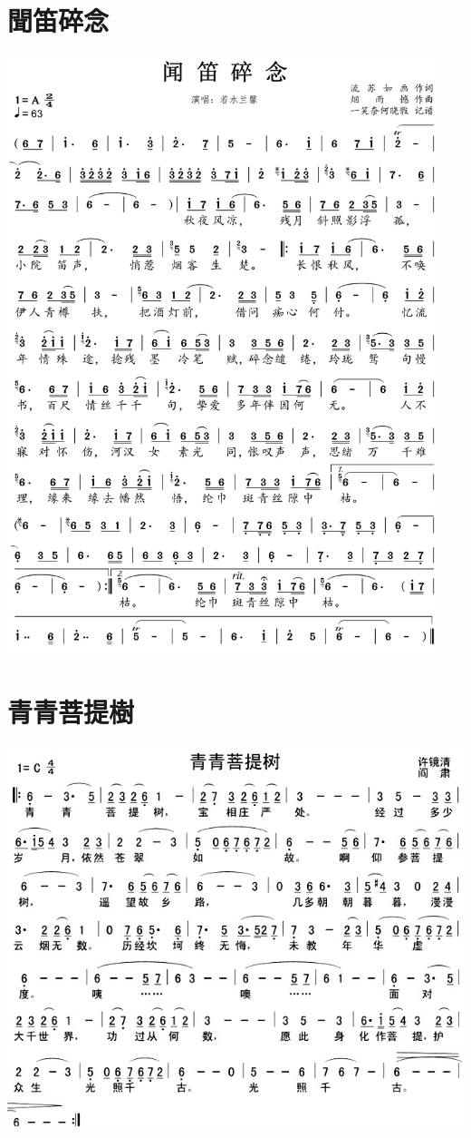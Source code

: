 \documentclass[cn,pad,twocol]{elegantbook}
\begin{document}
\section{聞笛碎念}  \includegraphics[width=0.95\textwidth]{dongxiao/20201231-闻地碎念} 
\section{青青菩提樹}\includegraphics[width=\textwidth]{dongxiao/20201231-青青菩提树}
\end{document}
